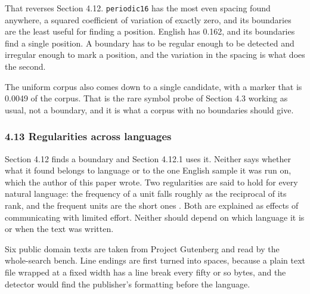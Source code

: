 That reverses Section 4.12. \texttt{periodic16} has the most even spacing found anywhere, a squared coefficient of variation of exactly zero, and its boundaries are the least useful for finding a position. English has 0.162, and its boundaries find a single position. A boundary has to be regular enough to be detected and irregular enough to mark a position, and the variation in the spacing is what does the second.

The uniform corpus also comes down to a single candidate, with a marker that is 0.0049 of the corpus. That is the rare symbol probe of Section 4.3 working as usual, not a boundary, and it is what a corpus with no boundaries should give.

\subsubsection{4.13 Regularities across languages}

Section 4.12 finds a boundary and Section 4.12.1 uses it. Neither says whether what it found belongs to language or to the one English sample it was run on, which the author of this paper wrote. Two regularities are said to hold for every natural language: the frequency of a unit falls roughly as the reciprocal of its rank, and the frequent units are the short ones \cite{src:Zipf}. Both are explained as effects of communicating with limited effort. Neither should depend on which language it is or when the text was written.

Six public domain texts are taken from Project Gutenberg \cite{src:Project-Gutenberg} and read by the whole-search bench. Line endings are first turned into spaces, because a plain text file wrapped at a fixed width has a line break every fifty or so bytes, and the detector would find the publisher's formatting before the language.

